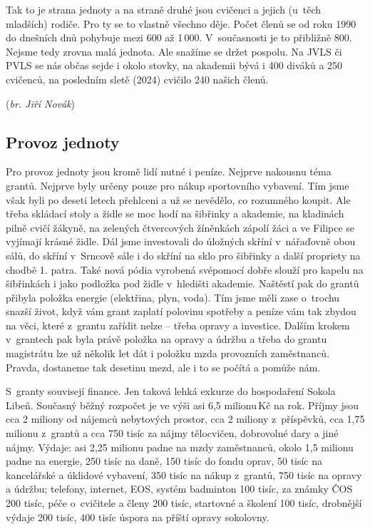 \documentclass[a5paper, 11pt, twoside]{article}
\begin{document}
Tak to je strana jednoty a na straně druhé jsou cvičenci a jejich
(u~těch mladších) rodiče. Pro ty se to vlastně všechno děje. Počet členů se
od roku 1990 do dnešních dnů pohybuje mezi 600 až 1\,000. V~současnosti
je to přibližně 800. Nejsme tedy zrovna malá jednota. Ale snažíme se
držet pospolu. Na JVLS či PVLS se nás občas sejde i okolo stovky, na
akademii bývá i 400 diváků a 250 cvičenců, na posledním sletě (2024)
cvičilo 240 našich členů.

\hfill(\textit{br. Jiří Novák})

\subsection{Provoz jednoty}

{\sloppy Pro provoz jednoty jsou kromě lidí nutné i peníze. Nejprve nakousnu téma
grantů. Nejprve byly určeny pouze pro nákup sportovního vybavení. Tím
jsme však byli po deseti letech přehlceni a už se nevědělo, co rozumného
koupit. Ale třeba skládací stoly a židle se moc hodí na šibřinky a
akademie, na kladinách pilně cvičí žákyně, na zelených čtvercových
žíněnkách zápolí žáci a ve Filipce se vyjímají krásné židle. Dál jsme
investovali do úložných skříní v~nářaďovně obou sálů, do skříní
v~Srncově sále i do skříní na sklo pro šibřinky a další propriety na
chodbě 1. patra. Také nová pódia vyrobená svépomocí dobře slouží pro
kapelu na šibřinkách i jako podložka pod židle v~hledišti akademie.
Naštěstí pak do grantů přibyla položka energie (elektřina, plyn, voda).
Tím jsme měli zase o~trochu snazší život, když vám grant zaplatí
polovinu spotřeby a peníze vám tak zbydou na věci, které z~grantu
zařídit nelze -- třeba opravy a investice. Dalším krokem v~grantech pak
byla právě položka na opravy a údržbu a třeba do grantu magistrátu lze
už několik let dát i položku mzda provozních zaměstnanců. Pravda,
dostaneme tak desetinu mezd, ale i to se počítá a pomůže nám. \par}

S~granty souvisejí finance. Jen taková lehká exkurze do hospodaření
Sokola Libeň. Současný běžný rozpočet je ve výši asi 6,5 milionu\,Kč na
rok. Příjmy jsou cca 2 miliony od nájemců nebytových prostor, cca 2
miliony z~příspěvků, cca 1,75 milionu z~grantů a cca 750 tisíc za nájmy
tělocvičen, dobrovolné dary a jiné nájmy. Výdaje: asi 2,25 milionu padne
na mzdy zaměstnanců, okolo 1,5 milionu padne na energie, 250 tisíc na
daně, 150 tisíc do fondu oprav, 50 tisíc na kancelářské a úklidové
vybavení, 350 tisíc na nákup z~grantů, 750 tisíc na opravy a údržbu;
telefony, internet, EOS, systém badminton 100 tisíc, za známky ČOS 200
tisíc, péče o~cvičitele a členy 200 tisíc, startovné a školení 100
tisíc, drobnější výdaje 200 tisíc, 400 tisíc úspora na příští opravy
sokolovny.
\end{document}
